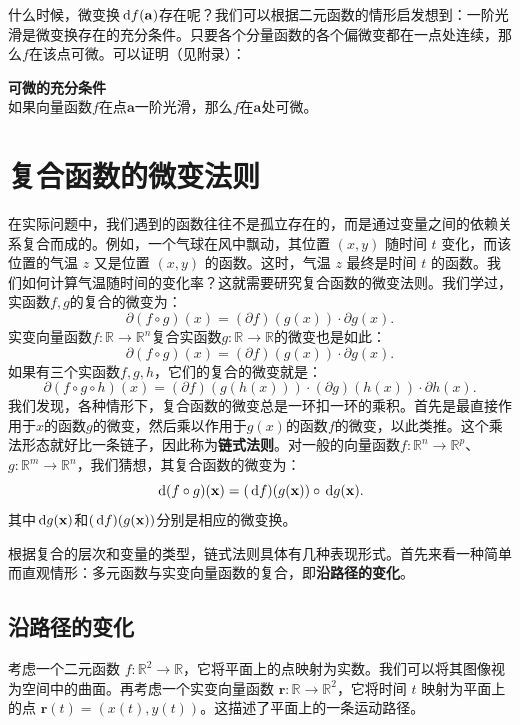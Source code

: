 \documentclass[12pt,UTF8]{ctexbook}
\begin{document}
什么时候，微变换$\,\mathrm{d} f (\mathbf{a})$存在呢？我们可以根据二元函数的情形启发想到：一阶光滑是微变换存在的充分条件。只要各个分量函数的各个偏微变都在一点处连续，那么$f$在该点可微。可以证明（见附录）：
\begin{tm}{\textbf{可微的充分条件}}\\
如果向量函数$f$在点$\mathbf{a}$一阶光滑，那么$f$在$\mathbf{a}$处可微。
\end{tm}

\section{复合函数的微变法则}

在实际问题中，我们遇到的函数往往不是孤立存在的，而是通过变量之间的依赖关系复合而成的。例如，一个气球在风中飘动，其位置 $(x, y)$ 随时间 $t$ 变化，而该位置的气温 $z$ 又是位置 $(x, y)$ 的函数。这时，气温 $z$ 最终是时间 $t$ 的函数。我们如何计算气温随时间的变化率？这就需要研究复合函数的微变法则。我们学过，实函数$f,g$的复合的微变为：
$$ \partial (f\circ g)(x) = (\partial f)(g(x)) \cdot \partial g(x). $$
实变向量函数$f:\mathbb{R}\rightarrow\mathbb{R}^n$复合实函数$g:\mathbb{R}\rightarrow\mathbb{R}$的微变也是如此：
$$ \partial (f \circ g) (x) = (\partial f)(g(x))\cdot \partial g(x). $$
如果有三个实函数$f,g,h$，它们的复合的微变就是：
$$ \partial (f \circ g\circ h) (x) = (\partial f)(g(h(x)))\cdot (\partial g)(h(x))\cdot \partial h(x). $$
我们发现，各种情形下，复合函数的微变总是一环扣一环的乘积。首先是最直接作用于$x$的函数$g$的微变，然后乘以作用于$g(x)$的函数$f$的微变，以此类推。这个乘法形态就好比一条链子，因此称为\textbf{链式法则}。对一般的向量函数$f:\mathbb{R}^n\rightarrow\mathbb{R}^p$、$g:\mathbb{R}^m\rightarrow\mathbb{R}^n$，我们猜想，其复合函数的微变为：
$$ \,\mathrm{d} (f \circ g) (\mathbf{x}) = (\,\mathrm{d} f)(g(\mathbf{x}))\circ \,\mathrm{d} g(\mathbf{x}). $$
其中$\,\mathrm{d} g(\mathbf{x})$和$(\,\mathrm{d} f)(g(\mathbf{x}))$分别是相应的微变换。

根据复合的层次和变量的类型，链式法则具体有几种表现形式。首先来看一种简单而直观情形：多元函数与实变向量函数的复合，即\textbf{沿路径的变化}。

\subsection{沿路径的变化}

考虑一个二元函数 $f: \mathbb{R}^2 \to \mathbb{R}$，它将平面上的点映射为实数。我们可以将其图像视为空间中的曲面。再考虑一个实变向量函数 $\mathbf{r}: \mathbb{R} \to \mathbb{R}^2$，它将时间 $t$ 映射为平面上的点 $\mathbf{r}(t) = (x(t), y(t))$。这描述了平面上的一条运动路径。
\end{document}
